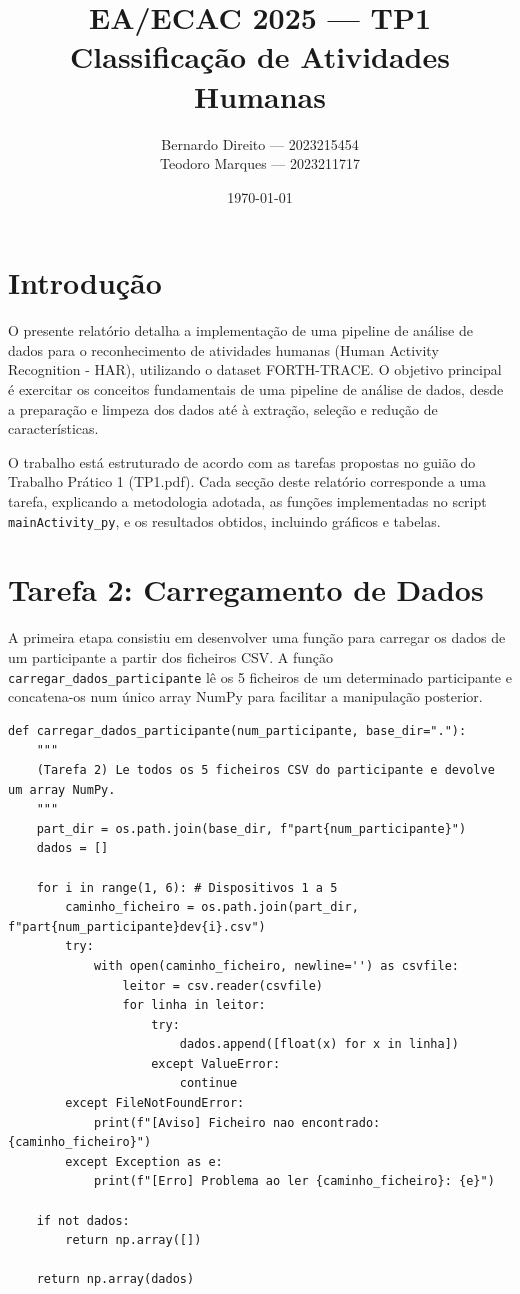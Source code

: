 \documentclass[11pt,a4paper]{article}
\title{EA/ECAC 2025 --- TP1\\Classificação de Atividades Humanas}
\author{Bernardo Direito --- 2023215454\\Teodoro Marques --- 2023211717}
\date{\today}
\begin{document}
\maketitle

\section{Introdução}
O presente relatório detalha a implementação de uma pipeline de análise de dados para o reconhecimento de atividades humanas (Human Activity Recognition - HAR), utilizando o dataset FORTH-TRACE. O objetivo principal é exercitar os conceitos fundamentais de uma pipeline de análise de dados, desde a preparação e limpeza dos dados até à extração, seleção e redução de características.

O trabalho está estruturado de acordo com as tarefas propostas no guião do Trabalho Prático 1 (TP1.pdf). Cada secção deste relatório corresponde a uma tarefa, explicando a metodologia adotada, as funções implementadas no script \texttt{mainActivity\_py}, e os resultados obtidos, incluindo gráficos e tabelas.

\section{Tarefa 2: Carregamento de Dados}
A primeira etapa consistiu em desenvolver uma função para carregar os dados de um participante a partir dos ficheiros CSV. A função \texttt{carregar\_dados\_participante} lê os 5 ficheiros de um determinado participante e concatena-os num único array NumPy para facilitar a manipulação posterior.

\begin{lstlisting}[caption={Função para carregar os dados de um participante.}, label={lst:load_data}]
def carregar_dados_participante(num_participante, base_dir="."):
    """
    (Tarefa 2) Le todos os 5 ficheiros CSV do participante e devolve um array NumPy.
    """
    part_dir = os.path.join(base_dir, f"part{num_participante}")
    dados = []

    for i in range(1, 6): # Dispositivos 1 a 5
        caminho_ficheiro = os.path.join(part_dir, f"part{num_participante}dev{i}.csv")
        try:
            with open(caminho_ficheiro, newline='') as csvfile:
                leitor = csv.reader(csvfile)
                for linha in leitor:
                    try:
                        dados.append([float(x) for x in linha])
                    except ValueError:
                        continue
        except FileNotFoundError:
            print(f"[Aviso] Ficheiro nao encontrado: {caminho_ficheiro}")
        except Exception as e:
            print(f"[Erro] Problema ao ler {caminho_ficheiro}: {e}")

    if not dados:
        return np.array([])
        
    return np.array(dados)
\end{lstlisting}
\end{document}
